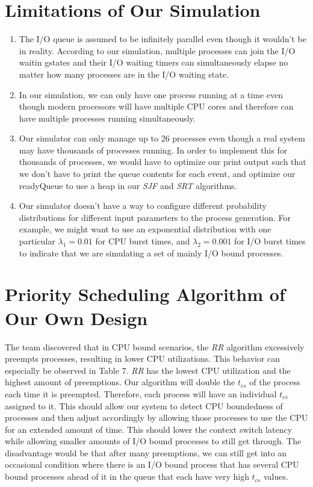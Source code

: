 \documentclass{article}
\begin{document}
\section{Limitations of Our Simulation}
\begin{doublespace}
\begin{enumerate}
  \item The I/O queue is assumed to be infinitely parallel even though it wouldn't be in reality. 
  According to our simulation, multiple processes can join the I/O waitin gstates and their I/O waiting timers
  can simultaneously elapse no matter how many processes are in the I/O waiting state.
  \item In our simulation, we can only have one process running at a time even though modern processors will have 
  multiple CPU cores and therefore can have multiple processes running simultaneously.
  \item Our simulator can only manage up to 26 processes even though a real system may have thousands of processes running. 
  In order to implement this for thousands of processes, we would have to optimize our print output such that we don't 
  have to print the queue contents for each event, and optimize our readyQueue to use a heap in our \textit{SJF} and \textit{SRT}
  algorithms.
  \item Our simulator doesn't have a way to configure different probability distributions for different input parameters
  to the process generation. For example, we might want to use an exponential distribution with one particular $\lambda_1 = 0.01$
  for CPU burst times, and $\lambda_2 = 0.001$ for I/O burst times to indicate that we are simulating a set of mainly I/O bound 
  processes.
\end{enumerate}
\end{doublespace}
\section{Priority Scheduling Algorithm of Our Own Design}
\begin{doublespace}
The team discovered that in CPU bound scenarios, the \textit{RR} algorithm excessively preempts processes, resulting in 
lower CPU utilizations. This behavior can especially be observed in Table 7. \textit{RR} has the lowest CPU utilization 
and the highest amount of preemptions. Our algorithm will double the $t_{cs}$ of the process each time it is preempted. 
Therefore, each process will have an individual $t_{cs}$ assigned to it. This should allow our system to detect 
CPU boundedness of processes and then adjust accordingly by allowing those processes to use the CPU for an extended amount of time. 
This should lower the context switch latency while allowing smaller amounts of I/O bound processes to still get through. The 
disadvantage would be that after many preemptions, we can still get into an occasional condition where there is an I/O bound 
process that has several CPU bound processes ahead of it in the queue that each have very high $t_{cs}$ values. 
\end{doublespace}
\end{document}
